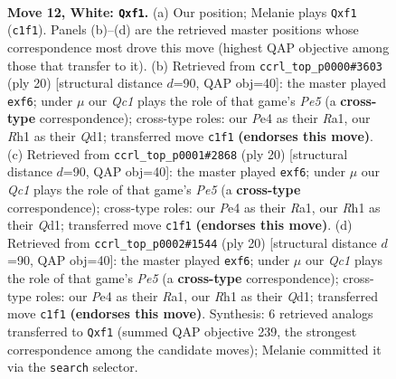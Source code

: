\documentclass[11pt]{article}
\begin{document}
\clearpage

\begin{figure}[p]\centering
\begin{subfigure}{0.46\textwidth}\centering
\resizebox{\linewidth}{!}{%
\newchessgame
\chessboard[
  setfen={rn1qkb1r/5p2/3p1np1/2pPp3/4P1p1/2N1B3/PP1K1P1P/R1Q2bNR w kq - 0 12},
  showmover=false,
  pgfstyle=straightmove, color=movearrow, markmove={c1-f1}
]}
\caption{}
\end{subfigure}\hfill
\begin{subfigure}{0.46\textwidth}\centering
\resizebox{\linewidth}{!}{%
\newchessgame
\chessboard[
  setfen={rnbqk2r/p3bp2/2p1pn2/1p2P1B1/2pP4/2N5/PP3PPP/R2QKB1R w KQkq - 1 11},
  showmover=false,
  pgfstyle=straightmove, color=movearrow, markmove={e5-f6}
]}
\caption{}
\end{subfigure}
\\[4pt]
\begin{subfigure}{0.46\textwidth}\centering
\resizebox{\linewidth}{!}{%
\newchessgame
\chessboard[
  setfen={rnbqk2r/p3bp2/2p1pn2/1p2P1B1/2pP4/2N5/PP3PPP/R2QKB1R w KQkq - 1 11},
  showmover=false,
  pgfstyle=straightmove, color=movearrow, markmove={e5-f6}
]}
\caption{}
\end{subfigure}\hfill
\begin{subfigure}{0.46\textwidth}\centering
\resizebox{\linewidth}{!}{%
\newchessgame
\chessboard[
  setfen={rnbqk2r/p3bp2/2p1pn2/1p2P1B1/2pP4/2N5/PP3PPP/R2QKB1R w KQkq - 1 11},
  showmover=false,
  pgfstyle=straightmove, color=movearrow, markmove={e5-f6}
]}
\caption{}
\end{subfigure}
\caption{\textbf{Move 12, White: \texttt{Qxf1}.} (a) Our position; Melanie plays \texttt{Qxf1} (\texttt{c1f1}). Panels (b)--(d) are the retrieved master positions whose correspondence most drove this move (highest QAP objective among those that transfer to it). (b) Retrieved from \texttt{ccrl\_top\_p0000\#3603} (ply 20) [structural distance $d$=90, QAP obj=40]: the master played \texttt{exf6}; under $\mu$ our \emph{Qc1} plays the role of that game's \emph{Pe5} (a \textbf{cross-type} correspondence); cross-type roles: our \emph{P}e4 as their \emph{R}a1, our \emph{R}h1 as their \emph{Q}d1; transferred move \texttt{c1f1} \textbf{(endorses this move)}. (c) Retrieved from \texttt{ccrl\_top\_p0001\#2868} (ply 20) [structural distance $d$=90, QAP obj=40]: the master played \texttt{exf6}; under $\mu$ our \emph{Qc1} plays the role of that game's \emph{Pe5} (a \textbf{cross-type} correspondence); cross-type roles: our \emph{P}e4 as their \emph{R}a1, our \emph{R}h1 as their \emph{Q}d1; transferred move \texttt{c1f1} \textbf{(endorses this move)}. (d) Retrieved from \texttt{ccrl\_top\_p0002\#1544} (ply 20) [structural distance $d$=90, QAP obj=40]: the master played \texttt{exf6}; under $\mu$ our \emph{Qc1} plays the role of that game's \emph{Pe5} (a \textbf{cross-type} correspondence); cross-type roles: our \emph{P}e4 as their \emph{R}a1, our \emph{R}h1 as their \emph{Q}d1; transferred move \texttt{c1f1} \textbf{(endorses this move)}. Synthesis: 6 retrieved analogs transferred to \texttt{Qxf1} (summed QAP objective 239, the strongest correspondence among the candidate moves); Melanie committed it via the \texttt{search} selector.}

\end{figure}
\end{document}
